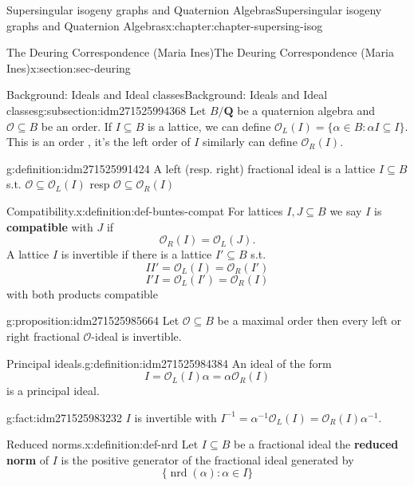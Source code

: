 \documentclass[oneside,10pt,]{book}
\newcommand{\terminology}[1]{\textbf{#1}}
\numberwithin{equation}{section}
\newcommand{\inv}{^{-1}}
\newcommand{\QQ}{\mathbf{Q}}
\newcommand{\ints}{\mathcal{O}}
\begin{document}
\begin{chapterptx}{Supersingular isogeny graphs and Quaternion Algebras}{}{Supersingular isogeny graphs and Quaternion Algebras}{}{}{x:chapter:chapter-supersing-isog}
\begin{sectionptx}{The Deuring Correspondence (Maria Ines)}{}{The Deuring Correspondence (Maria Ines)}{}{}{x:section:sec-deuring}
\begin{subsectionptx}{Background: Ideals and Ideal classes}{}{Background: Ideals and Ideal classes}{}{}{g:subsection:idm271525994368}
Let \(B/\QQ\) be a quaternion algebra and  \(\ints \subseteq B\) be an order. If \(I \subseteq B \) is a  lattice, we can define \(\ints_L (I) = \{ \alpha\in  B :  \alpha I  \subseteq I \}\). This is an order , it's the left order of  \(I\) similarly can define \(\ints_R (I) \).%
\begin{definition}{}{g:definition:idm271525991424}%
A left (resp. right) fractional ideal is a lattice \(I \subseteq B\) s.t. \(\ints \subseteq       \ints_L (I) \) resp \(\ints \subseteq \ints_R (I) \)%
\end{definition}
\begin{definition}{Compatibility.}{x:definition:def-buntes-compat}%
For lattices \(I,J \subseteq B\) we say \(I\) is \terminology{compatible} with \(J\) if%
\begin{equation*}
\ints_R(I)= \ints_L(J)\text{.}
\end{equation*}
A lattice \(I \) is invertible if there is a lattice \(I' \subseteq B\) s.t.%
\begin{equation*}
II' = \ints_L(I) =  \ints_R(I')
\end{equation*}
%
\begin{equation*}
I'I = \ints_L(I') =  \ints_R(I)
\end{equation*}
with both products compatible%
\end{definition}
\begin{proposition}{}{}{g:proposition:idm271525985664}%
Let \(\ints \subseteq B\) be a maximal order then every left or right fractional \(\ints\)-ideal is invertible.%
\end{proposition}
\begin{definition}{Principal ideals.}{g:definition:idm271525984384}%
An ideal of the form%
\begin{equation*}
I =  \ints_L(I) \alpha =  \alpha\ints_R(I)
\end{equation*}
is a principal ideal.%
\end{definition}
\begin{fact}{}{}{g:fact:idm271525983232}%
\(I \) is invertible with \(I\inv = \alpha \inv \ints_L(I) =  \ints_R(I) \alpha \inv\).%
\end{fact}
\begin{definition}{Reduced norms.}{x:definition:def-nrd}%
Let \(I \subseteq B\) be a fractional ideal the \terminology{reduced norm} of \(I \) is the positive generator of the fractional ideal generated by%
\begin{equation*}
\{ \operatorname{nrd} (\alpha) :  \alpha \in I \}
\end{equation*}

\end{definition}
\end{subsectionptx}
\end{sectionptx}
\end{chapterptx}
\end{document}
